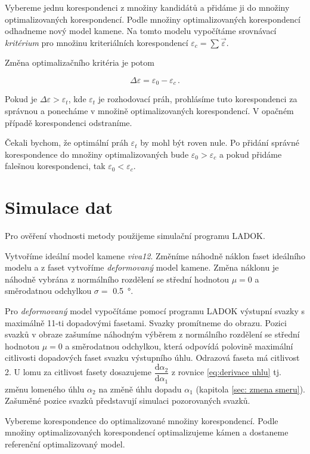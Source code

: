 	Vybereme jednu korespondenci z množiny kandidátů a přidáme ji do množiny optimalizovaných korespondencí. Podle množiny optimalizovaných korespondencí odhadneme nový model kamene. Na tomto modelu  vypočítáme srovnávací \textit{kritérium} pro množinu kriteriálních korespondencí $\varepsilon_c = \sum\vec{\varepsilon}$. 
	
	Změna optimalizačního kritéria je potom 
	
	\begin{equation}
	\Delta\varepsilon  = \varepsilon_0 - \varepsilon_c\,.
	\end{equation}
	
	Pokud je $\Delta\varepsilon  > \varepsilon_t$, kde $\varepsilon_t$ je rozhodovací práh, prohlásíme tuto korespondenci za správnou a ponecháme v množině optimalizovaných korespondencí. V opačném případě korespondenci odstraníme.
	
	Čekali bychom, že optimální práh $\varepsilon_t$ by mohl být roven nule. Po přidání správné korespondence do množiny optimalizovaných bude  $\varepsilon_0 > \varepsilon_c$ a pokud přidáme falešnou korespondenci, tak $\varepsilon_0 < \varepsilon_c$. 

\section{Simulace dat}
\label{sec: sber dat}
	Pro ověření vhodnosti metody použijeme simulační programu LADOK. 	
	
	Vytvoříme ideální model kamene \textit{viva12}. Změníme náhodně náklon faset ideálního modelu a z faset vytvoříme \textit{deformovaný} model kamene. Změna náklonu je náhodně vybrána z normálního rozdělení se střední hodnotou $\mu = 0$ a směrodatnou odchylkou $\sigma = $ \SI{0.5}{\degree}. 
	
	 Pro \textit{deformovaný} model vypočítáme pomocí programu LADOK výstupní svazky s maximálně 11-ti dopadovými fasetami. Svazky promítneme do obrazu. Pozici svazků v obraze zašumíme náhodným výběrem z normálního rozdělení se střední hodnotou $\mu = 0$ a směrodatnou odchylkou, která odpovídá polovině maximální citlivosti dopadových faset svazku výstupního úhlu. Odrazová faseta má citlivost 2. U lomu za citlivost fasety dosazujeme $\dfrac{\mathrm{d}\alpha_2}{\mathrm{d}\alpha_1}$ z rovnice \ref{eq:derivace uhlu} tj. změnu lomeného úhlu $\alpha_2$ na změně úhlu dopadu $\alpha_1$ (kapitola \ref{sec: zmena smeru}). Zašuměné pozice svazků představují simulaci pozorovaných svazků.  
	 
	Vybereme korespondence do optimalizované množiny korespondencí. Podle množiny optimalizovaných korespondencí optimalizujeme kámen a dostaneme referenční optimalizovaný model. 
	
